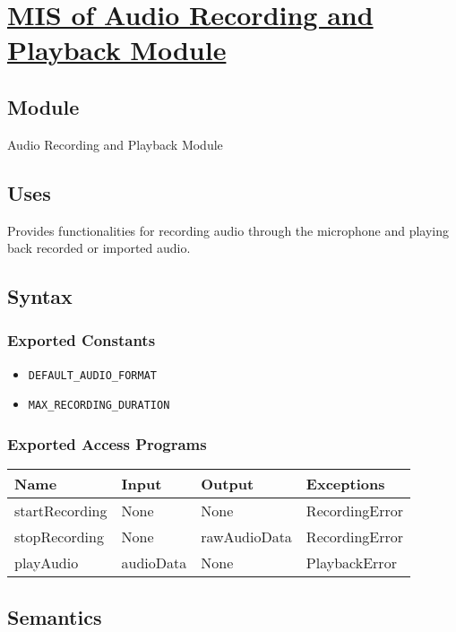 \documentclass[12pt, titlepage]{article}
\begin{document}
\section{\hyperref[mARP]{MIS of Audio Recording and Playback Module}} \label{M7}  

\subsection{Module}  
Audio Recording and Playback Module  

\subsection{Uses}  
Provides functionalities for recording audio through the microphone and playing back recorded or imported audio.  

\subsection{Syntax}  

\subsubsection{Exported Constants}  
\begin{itemize}
    \item \texttt{DEFAULT\_AUDIO\_FORMAT}  
    \item \texttt{MAX\_RECORDING\_DURATION}  
\end{itemize}  

\subsubsection{Exported Access Programs}  
\begin{center}  
\begin{tabular}{|p{3cm}|p{4cm}|p{4cm}|p{3cm}|}  
\hline  
\textbf{Name} & \textbf{Input} & \textbf{Output} & \textbf{Exceptions} \\  
\hline  
startRecording & None & None & RecordingError \\  
stopRecording & None & rawAudioData & RecordingError \\  
playAudio & audioData & None & PlaybackError \\  
\hline  
\end{tabular}  
\end{center}  

\subsection{Semantics}  
\end{document}
